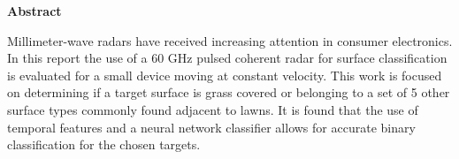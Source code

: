 \newenvironment{abstract}%
    {\cleardoublepage\thispagestyle{empty}\null\vfill\begin{center}%
    \bfseries{\textsf{Abstract}}\end{center}}%
    {\vfill\null}
        \begin{abstract}
        Millimeter-wave radars have received increasing attention in consumer electronics. In this report the use of a 60 GHz pulsed coherent radar for surface classification is evaluated for a small device moving at constant velocity. This work is focused on determining if a target surface is grass covered or belonging to a set of 5 other surface types commonly found adjacent to lawns. It is found that the use of temporal features and a neural network classifier allows for accurate binary classification for the chosen targets. 

        \end{abstract}
